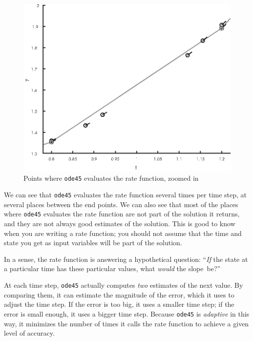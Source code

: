 \begin{figure}[h]
\centerline{\includegraphics[scale=0.8]{images/figure15_02_new.eps}}
\caption{Points where \lstinline{ode45} evaluates the rate function, zoomed in}
\label{fig:odeplot2}
\end{figure}

We can see that \lstinline{ode45} evaluates the rate function several times per time step, at several places between the end points.
We can also see that most of the places where \lstinline{ode45} evaluates the rate function are not part of the solution it returns, and they are not always good estimates of the solution.
This is good to know when you are writing a rate function; you should not assume that the time and state you get as input variables will be part of the solution.

In a sense, the rate function is answering a hypothetical question: ``\emph{If} the state at a particular time has these particular values, what \emph{would} the slope~be?''


At each time step, \lstinline{ode45} actually computes \emph{two} estimates of the next value.
By comparing them, it can estimate the magnitude of the error,  which it uses to adjust the time step.
If the error is too big, it uses a smaller time step; if the error is small enough, it uses a bigger time step.
Because \lstinline{ode45} is \emph{adaptive} in this way, it minimizes the number of times it calls the rate function to achieve a given level of accuracy.



